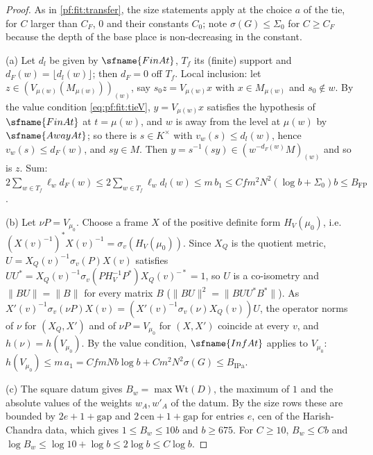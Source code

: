 \begin{proof}
As in \cref{pf:fit:transfer}, the size statements apply at the choice $a$ of the tie, for $C$ larger than $C_F$, $0$ and their
constants $C_0$; note $\sigma(G)\le\Sigma_0$ for $C\ge C_F$ because the depth of the base place is non-decreasing in the
constant.

(a) Let $d_l$ be given by $\sfname{FinAt}$, $T_f$ its (finite) support and $d_F(w)=\lfloor d_l(w)\rfloor$; then $d_F=0$
off $T_f$. Local inclusion: let $z\in(V_{\mu(w)}(M_{\mu(w)}))_{(w)}$, say $s_0z=V_{\mu(w)}x$ with $x\in M_{\mu(w)}$ and
$s_0\notin w$. By the value condition \eqref{eq:pf:fit:tieV}, $y=V_{\mu(w)}x$ satisfies the hypothesis of $\sfname{FinAt}$ at
$t=\mu(w)$, and $w$ is away from the level at $\mu(w)$ by $\sfname{AwayAt}$; so there is $s\in K^\times$ with
$v_w(s)\le d_l(w)$, hence $v_w(s)\le d_F(w)$, and $sy\in M$. Then $y=s^{-1}(sy)\in(w^{-d_F(w)}M)_{(w)}$ and so is $z$.
Sum: $2\sum_{w\in T_f}\ell_wd_F(w)\le2\sum_{w\in T_f}\ell_wd_l(w)\le m\,b_1\le Cfm^2N^2(\log b+\Sigma_0)b\le B_{\mathrm{FP}}$.

(b) Let $\nu P=V_{\mu_0}$. Choose a frame $X$ of the positive definite form $H_V(\mu_0)$, i.e.\
$(X(v)^{-1})^*X(v)^{-1}=\sigma_v(H_V(\mu_0))$. Since $X_Q$ is the quotient metric, $U=X_Q(v)^{-1}\sigma_v(P)X(v)$ satisfies
$UU^*=X_Q(v)^{-1}\sigma_v(PH_V^{-1}P^*)X_Q(v)^{-*}=1$, so $U$ is a co-isometry and $\|BU\|=\|B\|$ for every matrix $B$
($\|BU\|^2=\|BUU^*B^*\|$). As $X'(v)^{-1}\sigma_v(\nu P)X(v)=(X'(v)^{-1}\sigma_v(\nu)X_Q(v))U$, the operator norms of $\nu$ for
$(X_Q,X')$ and of $\nu P=V_{\mu_0}$ for $(X,X')$ coincide at every $v$, and $h(\nu)=h(V_{\mu_0})$. By the value condition,
$\sfname{InfAt}$ applies to $V_{\mu_0}$: $h(V_{\mu_0})\le m\,a_1=CfmNb\log b+Cm^2N^2\sigma(G)\le B_{\mathrm{IPa}}$.

(c) The square datum gives $B_w=\max\mathrm{Wt}(D)$, the maximum of $1$ and the absolute values of the weights $w_A,w'_A$ of
the datum. By the size rows these are bounded by $2e+1+\mathrm{gap}$ and $2\,\mathrm{cen}+1+\mathrm{gap}$ for entries $e$,
$\mathrm{cen}$ of the Harish-Chandra data, which gives $1\le B_w\le10b$ and $b\ge675$. For $C\ge10$, $B_w\le Cb$ and
$\log B_w\le\log10+\log b\le2\log b\le C\log b$.
\end{proof}

